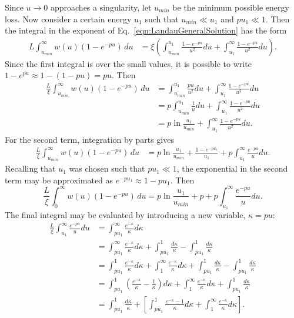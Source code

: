 Since $u\rightarrow 0$ approaches a singularity, let $u_{min}$ be the minimum possible energy loss. Now consider a certain energy $u_1$ such that $u_{min}\ll u_1$ and $pu_1 \ll 1$. Then the integral in the exponent of Eq.~\eqref{eqn:LandauGeneralSolution} has the form
\begin{align*}
L\int_{u_{min}}^\infty w(u)  (1-e^{-pu})\, du &= \xi\left( \int_{u_{min}} ^{u_1} \frac{1-e^{-pu}}{u^2} du + \int_{u_1} ^\infty \frac{1-e^{-pu}}{u^2} du\right) .
\end{align*}
Since the first integral is over the small values, it is possible to write $1-e^{pu} \approx 1-(1-pu) = pu$. Then
\begin{align*}
\frac{L}{\xi}\int_{u_{min}} ^\infty w(u)  (1-e^{-pu})\, du &=\int_{u_{min}} ^{u_1} \frac{pu}{u^2} du + \int_{u_1} ^\infty \frac{1-e^{-pu}}{u^2} du\\
&=p\int_{u_{min}} ^{u_1} \frac{1}{u} du + \int_{u_1} ^\infty \frac{1-e^{-pu}}{u^2} du\\
&=p \ln\frac{u_1}{u_{min}} + \int_{u_1} ^\infty \frac{1-e^{-pu}}{u^2} du.
\end{align*}
For the second term, integration by parts gives
\begin{align*}
\frac{L}{\xi}\int_{u_{min}} ^\infty w(u)  (1-e^{-pu})\, du &=p \ln\frac{u_1}{u_{min}} + \frac{1-e^{-pu_1}}{u_1}+p\int_{u_1}^\infty \frac{e^{-pu}}{u} du.
\end{align*}
Recalling that $u_1$ was chosen such that $pu_1 \ll 1$, the exponential in the second term may be approximated as $e^{-pu_1}\approx 1-pu_1$. Then
\begin{equation} \label{eqn:landauIntermediate1}
\frac{L}{\xi}\int_0 ^\infty w(u)  (1-e^{-pu})\, du =p \ln\frac{u_1}{u_{min}} + p+p\int_{u_1}^\infty \frac{e^{-pu}}{u} du.
\end{equation}
The final integral may be evaluated by introducing a new variable, $\kappa=pu$:
\begin{align*}
\frac{L}{\xi}\int_{u_1}^\infty \frac{e^{-pu}}{u} du &= \int _{pu_1} ^\infty \frac{e^{-\kappa}}{\kappa}d\kappa\\
&= \int_{pu_1} ^\infty \frac{e^{-\kappa}}{\kappa} d\kappa + \int_{pu_1} ^1 \frac{d\kappa}{\kappa} - \int_{pu_1} ^1 \frac{d\kappa}{\kappa} \\
&= \int_{pu_1} ^1 \frac{e^{-\kappa}}{\kappa} d\kappa + \int_1 ^\infty \frac{e^{-\kappa}}{\kappa} d\kappa + \int_{pu_1} ^1 \frac{d\kappa}{\kappa} - \int_{pu_1} ^1 \frac{d\kappa}{\kappa} \\
&= \int_{pu_1} ^1 \left(\frac{e^{-\kappa}}{\kappa}-\frac{1}{\kappa}\right) d\kappa + \int_1 ^\infty \frac{e^{-\kappa}}{\kappa} d\kappa + \int_{pu_1} ^1 \frac{d\kappa}{\kappa} \\
&= \int_{pu_1} ^1 \frac{d\kappa}{\kappa} + \left[\int_{pu_1} ^1 \frac{e^{-\kappa}-1}{\kappa} d\kappa + \int_1 ^\infty \frac{e^{-\kappa}}{\kappa} d\kappa \right].
\end{align*}
